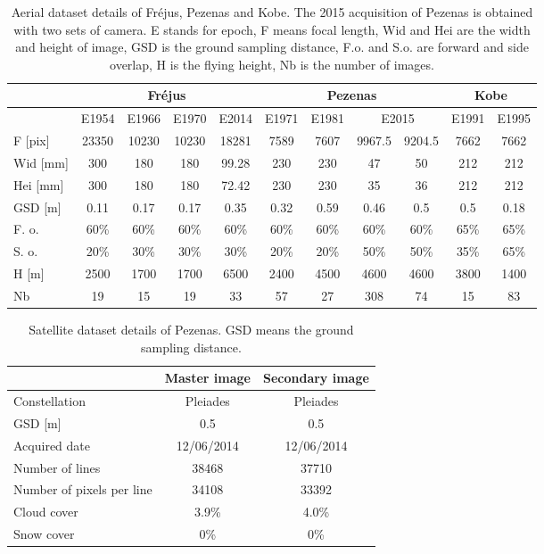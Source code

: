 \begin{table}[htbp]
    \scriptsize %
    \centering
    \begin{tabular}{||l|c|c|c|c||c|c|c|c||c|c||}\hline
        &\multicolumn{4}{c||}{Fr{\'e}jus}&\multicolumn{4}{c||}{Pezenas}&\multicolumn{2}{c||}{Kobe}\\\hline
                &E1954&E1966&E1970&E2014&E1971&E1981&\multicolumn{2}{c||}{E2015}&E1991&E1995\\\hline\hline
        F [pix]&23350&10230&10230&\color{black}18281&7589&7607&9967.5&9204.5&7662&7662\\
        Wid [mm]&300&180&180&99.28&230&230&47&50&212&212\\
        Hei [mm]&300&180&180&72.42&230&230&35&36&212&212\\
        GSD [m]&\color{black}0.11&\color{black}0.17&0.17&0.35&0.32&0.59&0.46&0.5&0.5&0.18\\
        F. o.&60\%&60\%&60\%&60\%&   60\%&60\%&60\%&60\%&   65\%&65\%\\
        S. o.&20\%&30\%&30\%&30\%&   20\%&20\%&50\%&50\%&   35\%&65\%\\
        H  [m]&2500&1700&1700&6500&2400&4500&4600&4600&3800&1400\\
        Nb &19&15&19&33&57&27&308&74&15&83\\\hline
    \end{tabular}
    \caption{Aerial dataset details of Fr{\'e}jus, Pezenas and Kobe. The 2015 acquisition of Pezenas is obtained with two sets of camera. E stands for epoch, F means focal length, Wid and Hei are the width and height of image, GSD is the ground sampling distance, F.o. and S.o. are forward and side overlap, H is the flying height, Nb is the number of images.}
    \label{AerialData}
\end{table}

\begin{table}[htbp]
	\scriptsize %
	\centering
	\begin{tabular}{||l|c|c||}\hline
		& Master image & Secondary image\\\hline
		Constellation & Pleiades & Pleiades \\
		GSD [m] & 0.5 & 0.5\\
		Acquired date & 12/06/2014 & 12/06/2014 \\
		Number of lines & 38468 & 37710 \\
		Number of pixels per line & 34108 & 33392 \\
		Cloud cover & 3.9\% & 4.0\% \\
		Snow cover & 0\% & 0\% \\\hline
	\end{tabular}
	\caption{Satellite dataset details of Pezenas. GSD means the ground sampling distance.}
	\label{SatelliteData}
\end{table}

